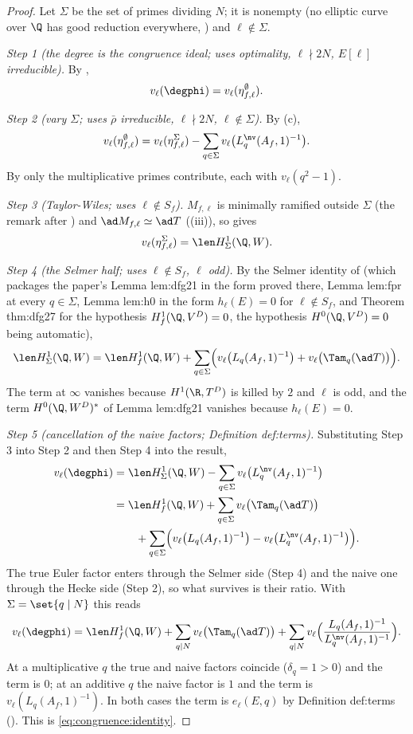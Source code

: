 \begin{proof}
Let $\Sigma$ be the set of primes dividing $N$; it is nonempty (no elliptic curve over $\Q$ has good reduction everywhere, ) and $\ell\notin\Sigma$.

\emph{Step 1 (the degree is the congruence ideal; uses optimality, $\ell\nmid2N$, $E[\ell]$ irreducible).} By ,
\[
v_\ell(\degphi)=v_\ell(\eta^\emptyset_{f,\ell}).
\]

\emph{Step 2 (vary $\Sigma$; uses $\bar\rho$ irreducible, $\ell\nmid2N$, $\ell\notin\Sigma$).} By (c),
\[
v_\ell(\eta^\emptyset_{f,\ell})=v_\ell(\eta^\Sigma_{f,\ell})-\sum_{q\in\Sigma}v_\ell\bigl(L^{\nv}_q(A_f,1)^{-1}\bigr).
\]
By  only the multiplicative primes contribute, each with $v_\ell(q^2-1)$.

\emph{Step 3 (Taylor-Wiles; uses $\ell\notin S_f$).} $M_{f,\ell}$ is minimally ramified outside $\Sigma$ (the remark after ) and $\ad M_{f,\ell}\simeq\ad T$
((iii)), so  gives
\[
v_\ell(\eta^\Sigma_{f,\ell})=\len H^1_\Sigma(\Q,W).
\]

\emph{Step 4 (the Selmer half; uses $\ell\notin S_f$, $\ell$ odd).} By the Selmer identity of  (which packages the paper's Lemma lem:dfg21 in the form proved there, Lemma
lem:fpr at every $q\in\Sigma$, Lemma lem:h0 in the form $h_\ell(E)=0$ for $\ell\notin S_f$, and Theorem thm:dfg27 for the hypothesis $H^1_f(\Q,V^D)=0$, the hypothesis $H^0(\Q,V^D)=0$ being automatic),
\[
\len H^1_\Sigma(\Q,W)=\len H^1_f(\Q,W)+\sum_{q\in\Sigma}\Bigl(v_\ell\bigl(L_q(A_f,1)^{-1}\bigr)+v_\ell\bigl(\Tam_q(\ad T)\bigr)\Bigr).
\]
The term at $\infty$ vanishes because $H^1(\R,T^D)$ is killed by $2$ and $\ell$ is odd, and the term $H^0(\Q,W^D)^*$ of Lemma lem:dfg21 vanishes because $h_\ell(E)=0$.

\emph{Step 5 (cancellation of the naive factors; Definition def:terms).} Substituting Step 3 into Step 2 and then Step 4 into the result,
\begin{align*}
v_\ell(\degphi)&=\len H^1_\Sigma(\Q,W)-\sum_{q\in\Sigma}v_\ell\bigl(L^{\nv}_q(A_f,1)^{-1}\bigr)\\
&=\len H^1_f(\Q,W)+\sum_{q\in\Sigma}v_\ell\bigl(\Tam_q(\ad T)\bigr)\\
&\qquad+\sum_{q\in\Sigma}\Bigl(v_\ell\bigl(L_q(A_f,1)^{-1}\bigr)-v_\ell\bigl(L^{\nv}_q(A_f,1)^{-1}\bigr)\Bigr).
\end{align*}
The true Euler factor enters through the Selmer side (Step 4) and the naive one through the Hecke side (Step 2), so what survives is their ratio. With $\Sigma=\set{q\mid N}$ this reads
\[
v_\ell(\degphi)=\len H^1_f(\Q,W)+\sum_{q\mid N}v_\ell\bigl(\Tam_q(\ad T)\bigr)+\sum_{q\mid N}v_\ell\Bigl(\frac{L_q(A_f,1)^{-1}}{L^{\nv}_q(A_f,1)^{-1}}\Bigr).
\]
At a multiplicative $q$ the true and naive factors coincide ($\delta_q=1>0$) and the term is $0$; at an additive $q$ the naive factor is $1$ and the term is $v_\ell(L_q(A_f,1)^{-1})$. In both cases the
term is $e_\ell(E,q)$ by Definition def:terms (). This is \eqref{eq:congruence:identity}.


\end{proof}
